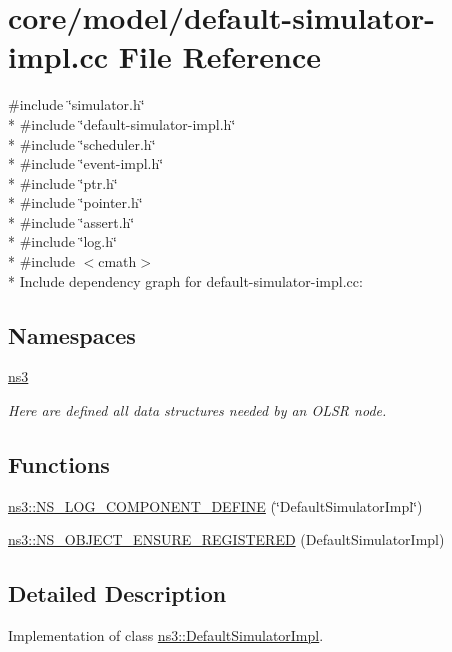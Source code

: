 \hypertarget{default-simulator-impl_8cc}{}\section{core/model/default-\/simulator-\/impl.cc File Reference}
\label{default-simulator-impl_8cc}
{\ttfamily \#include \char`\"{}simulator.\+h\char`\"{}}\\*
{\ttfamily \#include \char`\"{}default-\/simulator-\/impl.\+h\char`\"{}}\\*
{\ttfamily \#include \char`\"{}scheduler.\+h\char`\"{}}\\*
{\ttfamily \#include \char`\"{}event-\/impl.\+h\char`\"{}}\\*
{\ttfamily \#include \char`\"{}ptr.\+h\char`\"{}}\\*
{\ttfamily \#include \char`\"{}pointer.\+h\char`\"{}}\\*
{\ttfamily \#include \char`\"{}assert.\+h\char`\"{}}\\*
{\ttfamily \#include \char`\"{}log.\+h\char`\"{}}\\*
{\ttfamily \#include $<$cmath$>$}\\*
Include dependency graph for default-\/simulator-\/impl.cc\+:
\subsection*{Namespaces}
\begin{DoxyCompactItemize}
\item 
 \hyperlink{namespacens3}{ns3}
\begin{DoxyCompactList}\small\item\em Here are defined all data structures needed by an O\+L\+SR node. \end{DoxyCompactList}\end{DoxyCompactItemize}
\subsection*{Functions}
\begin{DoxyCompactItemize}
\item 
\hyperlink{namespacens3_a935713699d57678468503a02c71de657}{ns3\+::\+N\+S\+\_\+\+L\+O\+G\+\_\+\+C\+O\+M\+P\+O\+N\+E\+N\+T\+\_\+\+D\+E\+F\+I\+NE} (\char`\"{}Default\+Simulator\+Impl\char`\"{})
\item 
\hyperlink{namespacens3_aead8f8b3eb503fd44b08329f24abac35}{ns3\+::\+N\+S\+\_\+\+O\+B\+J\+E\+C\+T\+\_\+\+E\+N\+S\+U\+R\+E\+\_\+\+R\+E\+G\+I\+S\+T\+E\+R\+ED} (Default\+Simulator\+Impl)
\end{DoxyCompactItemize}


\subsection{Detailed Description}
Implementation of class \hyperlink{classns3_1_1DefaultSimulatorImpl}{ns3\+::\+Default\+Simulator\+Impl}. 